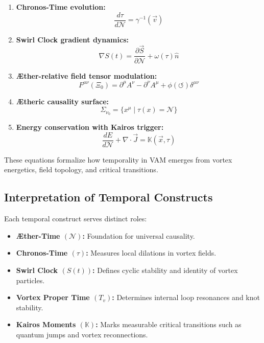 \begin{enumerate}
    \item \textbf{Chronos-Time evolution:}
    \begin{equation}
        \frac{d\tau}{d\mathcal{N}} = \gamma^{-1}(\vec{v})
    \label{eq:chronos_time}
    \end{equation}

    \item \textbf{Swirl Clock gradient dynamics:}
    \begin{equation}
        \nabla S(t) = \frac{\partial \vec{S}}{\partial \mathcal{N}} + \omega(\tau)\hat{n}
    \label{eq:swirl_clock}
    \end{equation}

    \item \textbf{Æther-relative field tensor modulation:}
    \begin{equation}
        F^{\mu\nu}(\Xi_0) = \partial^\mu A^\nu - \partial^\nu A^\mu + \phi(\circlearrowleft)\delta^{\mu\nu}
    \label{eq:Æther-field_tensor}
    \end{equation}

    \item \textbf{Ætheric causality surface:}
    \begin{equation}
        \Sigma_{\nu_0} = \{ x^\mu \mid \tau(x) = \mathcal{N} \}
    \label{eq:Æther-causality}
    \end{equation}

    \item \textbf{Energy conservation with Kairos trigger:}
    \begin{equation}
        \frac{dE}{d\mathcal{N}} + \nabla \cdot \vec{J} = \mathbb{K}(\vec{x}, \tau)
    \label{eq:Kairos_energy}
    \end{equation}
\end{enumerate}

These equations formalize how temporality in VAM emerges from vortex energetics, field topology, and critical transitions.

\subsection{Interpretation of Temporal Constructs}

Each temporal construct serves distinct roles:
\begin{itemize}
    \item \textbf{Æther-Time $(\mathcal{N})$:} Foundation for universal causality.
    \item \textbf{Chronos-Time $(\tau)$:} Measures local dilations in vortex fields.
    \item \textbf{Swirl Clock $(S(t))$:} Defines cyclic stability and identity of vortex particles.
    \item \textbf{Vortex Proper Time $(T_v)$:} Determines internal loop resonances and knot stability.
    \item \textbf{Kairos Moments $(\mathbb{K})$:} Marks measurable critical transitions such as quantum jumps and vortex reconnections.
\end{itemize}

